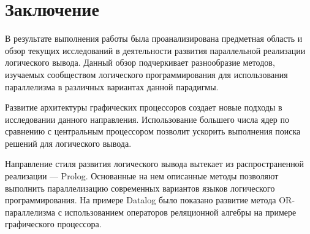 \chapter*{Заключение}

В результате выполнения работы была проанализирована предметная область и обзор текущих исследований в деятельности развития параллельной реализации логического вывода. Данный обзор подчеркивает разнообразие методов, изучаемых сообществом логического программирования для использования параллелизма в различных вариантах данной парадигмы.

Развитие архитектуры графических процессоров создает новые подходы в исследовании данного направления. Использование большего числа ядер по сравнению с центральным процессором позволит ускорить выполнения поиска решений для логического вывода. 

Направление стиля развития логического вывода вытекает из распространенной реализации --- Prolog. Основанные на нем описанные методы позволяют выполнить  параллелизацию современных вариантов языков логического программирования. На примере Datalog было показано развитие метода OR-параллелизма с использованием операторов реляционной алгебры на примере графического процессора. 